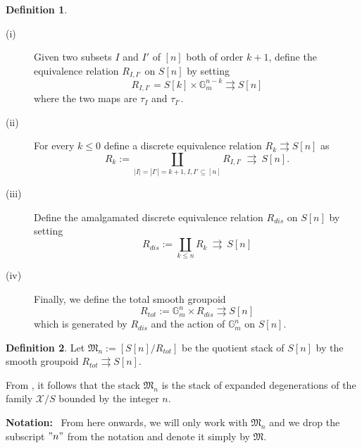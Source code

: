 \documentclass[11pt]{amsart}
\theoremstyle{plain}
\numberwithin{equation}{section}
\theoremstyle{definition}
\newtheorem{Def}{Definition}[section]
\theoremstyle{plain}
\begin{document}
\begin{Def}\label{Def.2.6}
\begin{description}
\item[(i)] Given two subsets $I$ and $I'$ of $[n]$ both of order $k+1$, define the equivalence relation $R_{I,I'}$ on $S[n]$  by setting 
\begin{equation}
R_{I,I'} = S[k]\times \mathbb{G}_m^{n-k}\rightrightarrows S[n]
\end{equation}
where the two maps are $\tau_I$ and $\tau_{I'}$.
\item[(ii)]  For every $k \leq 0$ define a discrete equivalence relation $R_{k} \rightrightarrows S[n]$ as
\begin{equation}
R_{k}:=\coprod_{|I|=|I'|=k+1, I, I'\subseteq [n]} R_{I, I'}  \ \rightrightarrows \ S[n].
\end{equation}
\item[(iii)] Define the amalgamated discrete equivalence relation $R_{dis}$ on $S[n]$ by setting
\begin{equation}
R_{dis}:=\coprod_{k\leq n} R_{k} \ \rightrightarrows \ S[n]
\end{equation}
\item[(iv)] Finally, we define the total smooth groupoid 
$$R_{tot}:=\mathbb{G}_m^n\times R_{dis} \rightrightarrows S[n]$$ 
which is generated by $R_{dis}$ and the action of $\mathbb{G}_m^n$ on $S[n]$.
\end{description}
\end{Def}

\smallskip

\begin{Def}\label{Def.2.7} Let 
$\mathfrak M_n:=\left[S[n]/R_{tot}\right]$
be the quotient stack of $S[n]$ by the smooth groupoid $R_{tot} \rightrightarrows S[n]$.
\end{Def}

\smallskip

\noindent
From \cite[Remark 2.23]{Z}, it follows that the stack $\mathfrak M_n$ is the stack of expanded degenerations of the family $\mathcal X/S$ bounded by the integer $n$. 

\smallskip

\noindent
{\textbf{Notation:}} \ {From here onwards, we will only work with $\mathfrak M_n$ and we drop the subscript $"n"$ from the notation and denote it simply by $\mathfrak M$.}

\smallskip
\end{document}
